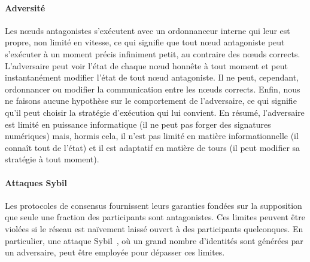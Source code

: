 \documentclass[letterpaper,twocolumn,10pt]{article}
\theoremstyle{definition}
\begin{document}
\paragraph{Adversité} %
Les nœuds antagonistes s'exécutent avec un ordonnanceur interne qui leur est propre, non limité en vitesse, ce qui signifie que tout nœud antagoniste peut s'exécuter à un moment précis infiniment petit, au contraire des nœuds corrects.
L'adversaire peut voir l'état de chaque nœud honnête à tout moment et peut instantanément modifier l'état de tout nœud antagoniste.
Il ne peut, cependant, ordonnancer ou modifier la communication entre les nœuds corrects.
Enfin, nous ne faisons aucune hypothèse sur le comportement de l'adversaire, ce qui signifie qu'il peut choisir la stratégie d'exécution qui lui convient.
En résumé, l'adversaire est limité en puissance informatique (il ne peut pas forger des signatures numériques) mais, hormis cela, il n'est pas limité en matière informationnelle (il connaît tout de l'état) et il est adaptatif en matière de tours (il peut modifier sa stratégie à tout moment).

\paragraph{Attaques Sybil}
Les protocoles de consensus fournissent leurs garanties fondées sur la supposition que seule une fraction des participants sont antagonistes.
Ces limites peuvent être violées si le réseau est naïvement laissé ouvert à des participants quelconques.
En particulier, une attaque Sybil~\cite{douceur2002sybil}, où un grand nombre d'identités sont générées par un adversaire, peut être employée pour dépasser ces limites.
\end{document}
